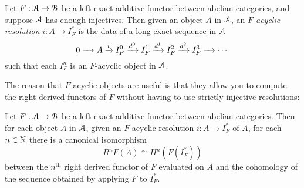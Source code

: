 \documentclass[../main.tex]{subfiles}
\begin{document}
\begin{definition}\label{defn:acyclic_resolution}
	Let $F:\mathcal A\to\mathcal B$ be a left exact additive functor between abelian categories, and suppose $\mathcal A$ has enough injectives. Then given an object $A$ in $\mathcal A$, an \emph{$F$-acyclic resolution} $i:A\to I_F^*$ is the data of a long exact sequence in $\mathcal A$
	\[0\xrightarrow{\phantom{d^2}}A\xrightarrow iI_F^0\xrightarrow{d^0}I_F^1\xrightarrow{d^1}I_F^2\xrightarrow{d^2}I_F^3\xrightarrow{\phantom{d^2}}\cdots\]
	such that each $I_F^n$ is an $F$-acyclic object in $\mathcal A$.
\end{definition}

The reason that $F$-acyclic objects are useful is that they allow you to compute the right derived functors of $F$ without having to use strictly injective resolutions:

\begin{proposition}\label{acyclic_resolution_computes_R^nF}
	Let $F:\mathcal A\to\mathcal B$ be a left exact additive functor between abelian categories. Then for each object $A$ in $\mathcal A$, given an $F$-acyclic resolution $i:A\to I_F^*$ of $A$, for each $n\in\mathbb{N}$ there is a canonical isomorphism
	\[R^nF(A)\cong H^n(F(I_F^*))\]
	between the $n^\text{th}$ right derived functor of $F$ evaluated on $A$ and the cohomology of the sequence obtained by applying $F$ to $I_F^*$.
\end{proposition}
\end{document}
